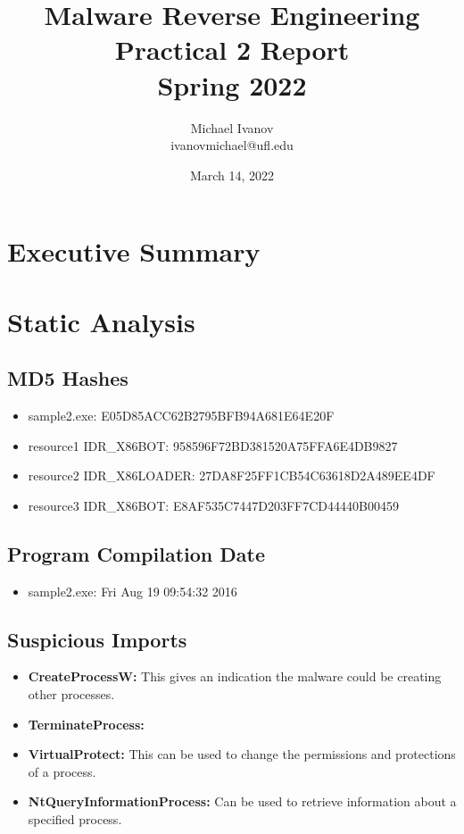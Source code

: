 \documentclass{article}
\title{Malware Reverse Engineering \\
Practical 2 Report \\
Spring 2022}
\author{Michael Ivanov \\
ivanovmichael@ufl.edu}
\date{March 14, 2022}
\begin{document}
    \maketitle
    \pagebreak
    \section{Executive Summary}
    \pagebreak
    \section{Static Analysis}

    \subsection{MD5 Hashes}
    \begin{itemize}
        \item sample2.exe: E05D85ACC62B2795BFB94A681E64E20F
        \item resource1 IDR{\_}X86BOT: 958596F72BD381520A75FFA6E4DB9827
        \item resource2 IDR{\_}X86LOADER: 27DA8F25FF1CB54C63618D2A489EE4DF
        \item resource3 IDR{\_}X86BOT: E8AF535C7447D203FF7CD44440B00459
    \end{itemize}

    \subsection{Program Compilation Date}
    \begin{itemize}
        \item sample2.exe: Fri Aug 19 09:54:32 2016
    \end{itemize}

    \subsection{Suspicious Imports}
    \begin{itemize}
        \item \textbf{CreateProcessW:} This gives an indication the malware could be creating other processes.
        \item \textbf{TerminateProcess:}
        \item \textbf{VirtualProtect:} This can be used to change the permissions and protections of a process.
        \item \textbf{NtQueryInformationProcess:} Can be used to retrieve information about a specified process.
    \end{itemize}
\end{document}
